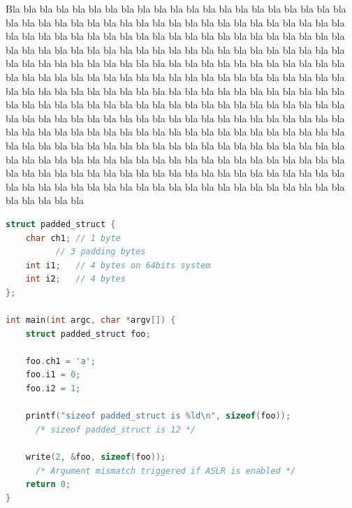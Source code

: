 \documentclass[english]{enstaPRE}
\begin{document}
Bla bla bla bla bla bla bla bla bla bla bla bla bla bla bla bla bla bla bla bla bla bla bla bla bla bla bla bla bla bla bla bla bla bla bla bla bla bla bla bla bla bla bla bla bla bla bla bla bla bla bla bla bla bla bla bla bla bla bla bla bla bla bla bla bla bla bla bla bla bla bla bla bla bla bla bla bla bla bla bla bla bla bla bla bla bla bla bla bla bla bla bla bla bla bla bla bla bla bla bla bla bla bla bla bla bla bla bla bla bla bla bla bla bla bla bla bla bla bla bla bla bla bla bla bla bla bla bla bla bla bla bla bla bla bla bla bla bla bla bla bla bla bla bla bla bla bla bla bla bla bla bla bla bla bla bla bla bla bla bla bla bla bla bla bla bla bla bla bla bla bla bla bla bla bla bla bla bla bla bla bla bla bla bla bla bla bla bla bla bla bla bla bla bla bla bla bla bla bla bla bla bla bla bla bla bla bla bla bla bla bla bla bla bla bla bla bla bla bla bla bla bla bla bla bla bla bla bla bla bla bla bla bla bla bla bla bla bla bla bla bla bla bla bla bla bla bla bla bla bla bla bla bla bla bla bla bla bla bla bla bla bla bla bla bla bla bla bla bla bla bla bla bla bla bla bla bla bla bla bla bla bla bla bla bla bla bla bla bla bla bla bla bla bla bla bla bla bla bla 



\afficheGlossaire

\afficheIndex

\listedestables

\listedesfigures








\begin{lstlisting}[frame=single, caption=Writing a padded structure, label=lst:padstruct, language=C]
struct padded_struct {
    char ch1; // 1 byte
	      // 3 padding bytes
    int i1;   // 4 bytes on 64bits system
    int i2;   // 4 bytes
};

int main(int argc, char *argv[]) {
    struct padded_struct foo;
    
    foo.ch1 = 'a';
    foo.i1 = 0;
    foo.i2 = 1;
    
    printf("sizeof padded_struct is %ld\n", sizeof(foo)); 
      /* sizeof padded_struct is 12 */
    
    write(2, &foo, sizeof(foo));
      /* Argument mismatch triggered if ASLR is enabled */
    return 0;
}
\end{lstlisting}\label{padded}
\end{document}
